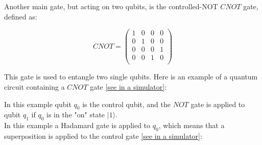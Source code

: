 \documentclass[twoside,twocolumn,9pt]{article}
\begin{document}
Another main gate, but acting on two qubits, is the controlled-NOT $CNOT$ gate, defined as:

\begin{equation}
CNOT=\begin{pmatrix}
  1 & 0 & 0 & 0 \\
  0 & 1 & 0 & 0 \\
  0 & 0 & 0 & 1 \\
  0 & 0 & 1 & 0 \\
\end{pmatrix}
\end{equation}

This gate is used to entangle two single qubits.
Here is an example of a quantum circuit containing a $CNOT$ gate \href{https://algassert.com/quirk#circuit={%22cols%22:[[%22%E2%80%A2%22,%22X%22]],%22init%22:[1]}}{[see in a simulator]}:

\begin{center}
  \end{center}

In this example qubit $q_0$ is the control qubit, and the $NOT$ gate is applied to qubit $q_1$ if $q_0$ is in the "on" state $|1\rangle$.\\
In this example a Hadamard gate is applied to $q_0$, which means that a superposition is applied to the control gate \href{https://algassert.com/quirk#circuit={%22cols%22:[[%22Chance%22,%22Chance%22],[%22Bloch%22,%22Bloch%22],[%22H%22],[%22Bloch%22],[%22%E2%80%A2%22,%22X%22]],%22init%22:[1]}}{[see in a simulator]}:
\end{document}
